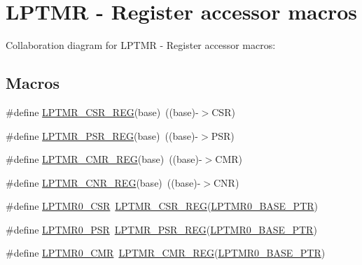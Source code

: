 \hypertarget{group___l_p_t_m_r___register___accessor___macros}{}\section{L\+P\+T\+MR -\/ Register accessor macros}
\label{group___l_p_t_m_r___register___accessor___macros}
Collaboration diagram for L\+P\+T\+MR -\/ Register accessor macros\+:
\subsection*{Macros}
\begin{DoxyCompactItemize}
\item 
\#define \hyperlink{group___l_p_t_m_r___register___accessor___macros_ga3e6fc450d0d86591343057973f33b114}{L\+P\+T\+M\+R\+\_\+\+C\+S\+R\+\_\+\+R\+EG}(base)~((base)-\/$>$C\+SR)
\item 
\#define \hyperlink{group___l_p_t_m_r___register___accessor___macros_ga5466d25d6ed5404f2257f2d06c0d21f5}{L\+P\+T\+M\+R\+\_\+\+P\+S\+R\+\_\+\+R\+EG}(base)~((base)-\/$>$P\+SR)
\item 
\#define \hyperlink{group___l_p_t_m_r___register___accessor___macros_ga0f229f84385a307ae6fa7133c9b0d2f0}{L\+P\+T\+M\+R\+\_\+\+C\+M\+R\+\_\+\+R\+EG}(base)~((base)-\/$>$C\+MR)
\item 
\#define \hyperlink{group___l_p_t_m_r___register___accessor___macros_ga0256237249b333d5beffb46f115f5659}{L\+P\+T\+M\+R\+\_\+\+C\+N\+R\+\_\+\+R\+EG}(base)~((base)-\/$>$C\+NR)
\item 
\#define \hyperlink{group___l_p_t_m_r___register___accessor___macros_ga92117617fde3b4150e2c04e6f828f565}{L\+P\+T\+M\+R0\+\_\+\+C\+SR}~\hyperlink{group___l_p_t_m_r___register___accessor___macros_ga3e6fc450d0d86591343057973f33b114}{L\+P\+T\+M\+R\+\_\+\+C\+S\+R\+\_\+\+R\+EG}(\hyperlink{group___l_p_t_m_r___peripheral_ga90a9194151ad11b422bcab162e797eda}{L\+P\+T\+M\+R0\+\_\+\+B\+A\+S\+E\+\_\+\+P\+TR})
\item 
\#define \hyperlink{group___l_p_t_m_r___register___accessor___macros_ga69b40af8e215d5b29b3f9677d7f8d632}{L\+P\+T\+M\+R0\+\_\+\+P\+SR}~\hyperlink{group___l_p_t_m_r___register___accessor___macros_ga5466d25d6ed5404f2257f2d06c0d21f5}{L\+P\+T\+M\+R\+\_\+\+P\+S\+R\+\_\+\+R\+EG}(\hyperlink{group___l_p_t_m_r___peripheral_ga90a9194151ad11b422bcab162e797eda}{L\+P\+T\+M\+R0\+\_\+\+B\+A\+S\+E\+\_\+\+P\+TR})
\item 
\#define \hyperlink{group___l_p_t_m_r___register___accessor___macros_gac109508795b1b22820940313ddb4c620}{L\+P\+T\+M\+R0\+\_\+\+C\+MR}~\hyperlink{group___l_p_t_m_r___register___accessor___macros_ga0f229f84385a307ae6fa7133c9b0d2f0}{L\+P\+T\+M\+R\+\_\+\+C\+M\+R\+\_\+\+R\+EG}(\hyperlink{group___l_p_t_m_r___peripheral_ga90a9194151ad11b422bcab162e797eda}{L\+P\+T\+M\+R0\+\_\+\+B\+A\+S\+E\+\_\+\+P\+TR})

\end{DoxyCompactItemize}
